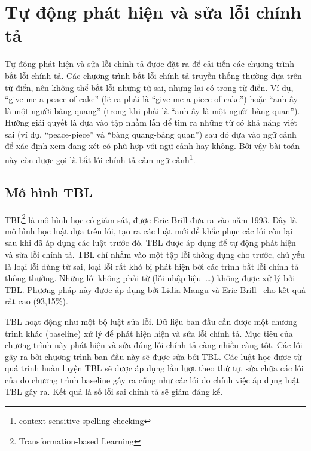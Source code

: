 \documentclass[a4paper,oneside,14pt]{extbook} %
\begin{document}
\section{Tự động phát hiện và sửa lỗi chính tả}
\label{sec:context-spelling}

Tự động phát hiện và sửa lỗi chính tả được đặt ra để cải tiến các
chương trình bắt lỗi chính tả. Các chương trình bắt lỗi chính tả
truyền thống thường dựa trên từ điển, nên không thể bắt lỗi những từ
sai, nhưng lại có trong từ điển. Ví dụ, ``give me a peace of cake''
(lẽ ra phải là ``give me a piece of cake'') hoặc ``anh ấy là một người
bàng quang'' (trong khi phải là ``anh ấy là một người bàng
quan''). Hướng giải quyết là dựa vào tập nhầm lẫn để tìm ra những từ
có khả năng viết sai (ví dụ, ``peace-piece'' và ``bàng quang-bàng
quan'') sau đó dựa vào ngữ cảnh để xác định xem đang xét có phù hợp
với ngữ cảnh hay không. Bởi vậy bài toán này còn được gọi là bắt lỗi
chính tả cảm ngữ cảnh\footnote{context-sensitive spelling
  checking}. 

\subsection{Mô hình TBL}
\label{sec:tbl-spell}


TBL\footnote{Transformation-based Learning} là mô hình học có giám sát,
được Eric Brill đưa ra vào năm 1993. Đây là mô hình học luật dựa trên
lỗi, tạo ra các luật mới để khắc phục các lỗi còn lại sau khi đã áp
dụng các luật trước đó. TBL được áp dụng để tự động phát hiện và sửa
lỗi chính tả. TBL chỉ nhắm vào một tập lỗi thông dụng cho trước, chủ
yếu là loại lỗi dùng từ sai, loại lỗi rất khó bị phát hiện bởi các
trình bắt lỗi chính tả thông thường. Những lỗi không phải từ (lỗi nhập
liệu~\ldots{}) không được xử lý bởi TBL. Phương pháp này được áp dụng
bởi Lidia Mangu và Eric Brill~\cite{tbl} cho kết quả rất cao
(93,15\%).

TBL hoạt động như một bộ luật sửa lỗi. Dữ liệu ban đầu cần được một
chương trình khác (baseline) xử lý để phát hiện hiện và sửa lỗi chính tả. Mục
tiêu của chương trình này phát hiện và sửa đúng lỗi chính tả càng
nhiều càng tốt. Các lỗi gây ra bởi chương trình ban đầu này sẽ được
sửa bởi TBL. Các luật học được từ quá trình huấn luyện TBL sẽ được áp
dụng lần lượt theo thứ tự, sửa chữa các lỗi của do chương trình
baseline gây ra cũng như các lỗi do chính việc áp dụng luật TBL gây
ra. Kết quả là số lỗi sai chính tả sẽ giảm đáng kể.
\end{document}
